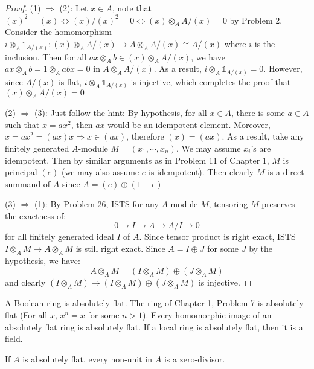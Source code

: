 \documentclass{solution}
\begin{document}
\begin{proof}
    (1) $\Rightarrow$ (2): Let $x \in A$, note that $(x)^2 = (x) \Leftrightarrow (x) / (x)^2 = 0 \Leftrightarrow (x) \otimes_A A / (x) = 0$ by Problem 2. Consider the homomorphism $i \otimes_A \mathds{1}_{A / (x)}: (x) \otimes_A A / (x) \rightarrow A \otimes_A A / (x) \cong A / (x)$ where $i$ is the inclusion. Then for all $ax \otimes_A \overline{b} \in (x) \otimes_A A / (x)$, we have $ax \otimes_A \overline{b} = 1\otimes_A \overline{abx} = 0$ in $A \otimes_A A / (x)$. As a result, $i \otimes_A \mathds{1}_{A / (x)} = 0$. However, since $A / (x)$ is flat, $i \otimes_A \mathds{1}_{A / (x)}$ is injective, which completes the proof that $(x) \otimes_A A / (x) = 0$

    (2) $\Rightarrow$ (3): Just follow the hint: By hypothesis, for all $x \in A$, there is some $a \in A$ such that $x = ax^2$, then $ax$ would be an idempotent element. Moreover, $x = ax^2 = (ax)x \Rightarrow x \in (ax)$, therefore $(x) = (ax)$. As a result, take any finitely generated $A$-module $M = (x_1, \cdots, x_n)$. We may assume $x_i$'s are idempotent. Then by similar arguments as in Problem 11 of Chapter 1, $M$ is principal $(e)$ (we may also assume $e$ is idempotent). Then clearly $M$ is a direct summand of $A$ since $A = (e) \oplus (1 - e)$

    (3) $\Rightarrow$ (1): By Problem 26, ISTS for any $A$-module $M$, tensoring $M$ preserves the exactness of:
    $$0 \rightarrow I \rightarrow A \rightarrow A / I \rightarrow 0$$
    for all finitely generated ideal $I$ of $A$. Since tensor product is right exact, ISTS $I \otimes_A M \rightarrow A \otimes_A M$ is still right exact. Since $A = I \oplus J$ for some $J$ by the hypothesis, we have:
    $$A \otimes_A M = (I \otimes_A M) \oplus (J \otimes_A M)$$
    and clearly $(I \otimes_A M) \rightarrow (I \otimes_A M) \oplus (J \otimes_A M)$ is injective.
\end{proof}

\begin{problem}
    A Boolean ring is absolutely flat. The ring of Chapter 1, Problem 7 is absolutely flat (For all $x$, $x^n = x$ for some $n \gt 1$). Every homomorphic image of an absolutely flat ring is absolutely flat. If a local ring is absolutely flat, then it is a field.

    If $A$ is absolutely flat, every non-unit in $A$ is a zero-divisor.
\end{problem}
\end{document}
